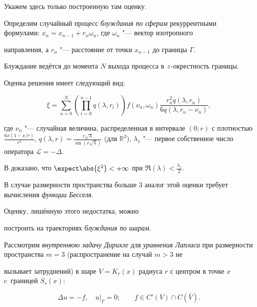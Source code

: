 Укажем здесь только построенную там оценку.



   Определим случайный процесс \emph{блуждания по сферам} рекуррентными формулами: ${x_n=x_{n-1}+r_n\omega_n}$,  где $\omega_n$ "--- вектор изотропного

направления,  а $r_n$ "--- расстояние от точки $x_{n-1}$ до границы $\Gamma$.

Блуждание ведётся до момента $N$ выхода процесса в~$\varepsilon$-окрестность границы.

Оценка решения имеет следующий вид:

    $$

        \xi=\sum_{n=0}^{N}\left(\prod_{i=0}^{n-1}q(\lambda,  r_i)\right)f(\nu_n, \omega_n)\frac{r^2_n q(\lambda,  r_n)}{6q(\lambda,

r_n-\nu_n)}, \label{kuznetsov:walkOnSpheres2}

    $$

    где $\nu_n$ "--- случайная величина,  распределенная в интервале $(0; r)$ с плотностью $\frac{6x(1-x/r)}{r^2}$,  $q(\lambda,

r)=\frac{r\sqrt{\lambda}}{\sin(r\sqrt{\lambda})}$ (для $\mathbb{R}^3$),  $\lambda_1$ "--- первое собственное число оператора $\mathcal{L}=-\Delta$.



    В \cite{kuznetsov:Mikhailov} доказано,  что $\expect\abs{\xi^2}<+\infty$ при $\Re(\lambda)<\frac{\lambda_1}{2}$.



    В случае размерности пространства больше $3$ аналог этой оценки требует вычисления \emph{функции Бесселя}.

Оценку,  лишённую этого недостатка, можно

построить на траекториях \emph{блуждания по шарам}.



    Рассмотрим \emph{внутреннюю задачу Дирихле} для \emph{уравнения Лапласа} при размерности пространства $m=3$ (распространение на случай $m>3$ не

вызывает затруднений) в шаре $V=K_r(x)$ радиуса $r$ с центром в точке $x$ c~границей $S_r(x)$:

\begin{equation}\label{kuznetsov:Lapl}

        \Delta u=-f,\quad   u\bigr|_\Gamma=0;\qquad

        f\in C'(V)\cap C(\bar V).

    \end{equation}

